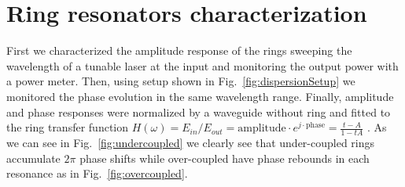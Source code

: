 \documentclass[journal]{IEEEtran}
\begin{document}
\section{Ring resonators characterization}


First we characterized the amplitude response of the rings sweeping the wavelength of a tunable laser at the input and monitoring the output power with a power meter. Then, using setup shown in Fig.~\ref{fig:dispersionSetup} we monitored the phase evolution in the same wavelength range. Finally, amplitude and phase responses were normalized by a waveguide without ring and fitted to the ring transfer function $H(\omega)=E_{in}/E_{out}=\mathrm{amplitude}\cdot e^{j\cdot \mathrm{phase}} = \frac{t-A}{1-tA}$ . As we can see in Fig.~\ref{fig:undercoupled} we clearly see that under-coupled rings accumulate $2\pi$ phase shifts while over-coupled have phase rebounds in each resonance as in Fig.~\ref{fig:overcoupled}. 



\end{document}
